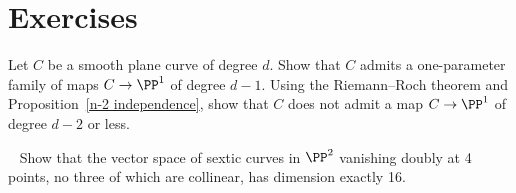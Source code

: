 \section{Exercises}

\begin{exercise}\label{gonality of smooth plane curve}
Let $C$ be a smooth plane curve of degree $d$. Show that $C$ admits a
one-parameter family of maps $C \to \PP^1$ of degree $d-1$. Using the
Riemann--Roch theorem
%
and Proposition~\ref{n-2 independence}, show
that $C$ does not admit a map $C \to \PP^1$ of degree $d-2$ or less.
\end{exercise}

\begin{exercise}~\label{double vanishing at 4 points}
Show that the vector space of
sextic curves
%
in $\PP^2$ vanishing doubly at 4 points, no three of which are
collinear,  has dimension
exactly 16.
\unskip\break %
\null\hfill
{}
\end{exercise}

